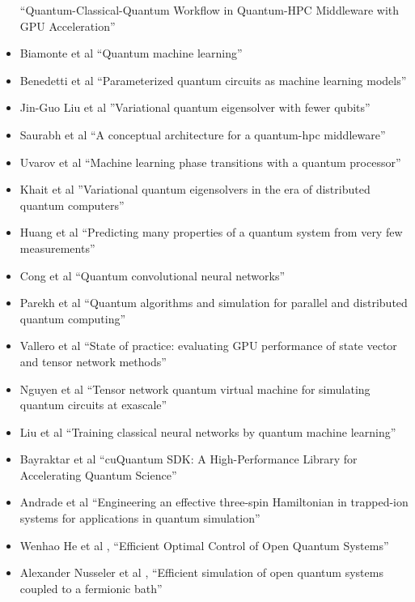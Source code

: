 \documentclass[]{article}
\begin{document}
\begin{itemize}
``Quantum-Classical-Quantum Workflow in Quantum-HPC Middleware with GPU Acceleration''
\item Biamonte et al\cite{biamonte2017quantum}
``Quantum machine learning''
\item Benedetti et al\cite{Benedetti_2019}
``Parameterized quantum circuits as machine learning models''
\item Jin-Guo Liu et al\cite{PhysRevResearch.1.023025}
''Variational quantum eigensolver with fewer qubits''
\item Saurabh et al\cite{saurabh2023conceptual}
``A conceptual architecture for a quantum-hpc middleware''
\item Uvarov et al\cite{uvarov2020machine}
``Machine learning phase transitions with a quantum processor''
\item Khait et al\cite{khait2023variational}
''Variational quantum eigensolvers in the era of distributed quantum computers''
\item Huang et al\cite{huang2020predicting}
``Predicting many properties of a quantum system from very few measurements''
\item Cong et al\cite{cong2019quantum}
``Quantum convolutional neural networks''
\item Parekh et al\cite{parekh2021quantum}
``Quantum algorithms and simulation for parallel and distributed quantum computing''
\item Vallero et al\cite{vallero2024state}
``State of practice: evaluating GPU performance of state vector and tensor network methods''
\item Nguyen et al\cite{nguyen2022tensor}
``Tensor network quantum virtual machine for simulating quantum circuits at exascale''
\item Liu et al\cite{liu2024training}
``Training classical neural networks by quantum machine learning''
\item Bayraktar et al\cite{10313722}
``cuQuantum SDK: A High-Performance Library for Accelerating Quantum Science''
\item Andrade et al\cite{Andrade_2022}
``Engineering an effective three-spin Hamiltonian in trapped-ion systems for applications in quantum simulation''
\item Wenhao He et al
 \cite{he2024efficientoptimalcontrolopen},
 ``Efficient Optimal Control of Open Quantum Systems''
\item Alexander Nusseler et al
\cite{PhysRevB.101.155134},
``Efficient simulation of open quantum systems coupled to a fermionic bath''

\end{itemize}
\end{document}
